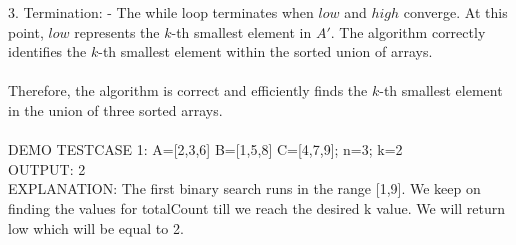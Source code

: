 \documentclass{article}
\begin{document}
3. Termination:
   - The while loop terminates when $low$ and $high$ converge. At this point, $low$ represents the $k$-th smallest element in $A'$. The algorithm correctly identifies the $k$-th smallest element within the sorted union of arrays.
\\\\
Therefore, the algorithm is correct and efficiently finds the $k$-th smallest element in the union of three sorted arrays.
\\\\
DEMO TESTCASE 1: A=[2,3,6] B=[1,5,8] C=[4,7,9]; n=3; k=2
\\
OUTPUT: 2
\\
EXPLANATION: The first binary search runs in the range [1,9]. We keep on finding the values for totalCount till we reach the desired k value. We will return low which will be equal to 2.
\end{document}
